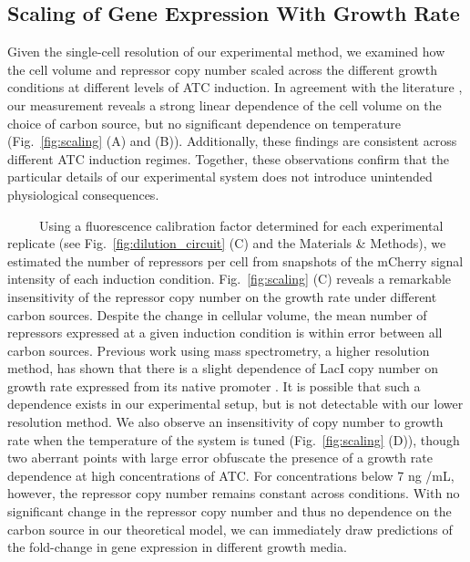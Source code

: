 \documentclass[12pt]{caltech_thesis}
\begin{document}
\hypertarget{scaling-of-gene-expression-with-growth-rate}{%
\subsection{Scaling of Gene Expression With Growth
Rate}\label{scaling-of-gene-expression-with-growth-rate}}

Given the single-cell resolution of our experimental method, we examined
how the cell volume and repressor copy number scaled across the
different growth conditions at different levels of ATC induction. In
agreement with the literature
\autocite{schaechter1958,jun2018,shehata1975}, our measurement reveals a
strong linear dependence of the cell volume on the choice of carbon
source, but no significant dependence on temperature
(Fig.~\ref{fig:scaling} (A) and (B)). Additionally, these findings are
consistent across different ATC induction regimes. Together, these
observations confirm that the particular details of our experimental
system does not introduce unintended physiological consequences.

~~~~~Using a fluorescence calibration factor determined for each
experimental replicate (see Fig.~\ref{fig:dilution_circuit} (C) and the
Materials \& Methods), we estimated the number of repressors per cell
from snapshots of the mCherry signal intensity of each induction
condition. Fig.~\ref{fig:scaling} (C) reveals a remarkable insensitivity
of the repressor copy number on the growth rate under different carbon
sources. Despite the change in cellular volume, the mean number of
repressors expressed at a given induction condition is within error
between all carbon sources. Previous work using mass spectrometry, a
higher resolution method, has shown that there is a slight dependence of
LacI copy number on growth rate expressed from its native promoter
\autocite{schmidt2016}. It is possible that such a dependence exists in
our experimental setup, but is not detectable with our lower resolution
method. We also observe an insensitivity of copy number to growth rate
when the temperature of the system is tuned (Fig.~\ref{fig:scaling}
(D)), though two aberrant points with large error obfuscate the presence
of a growth rate dependence at high concentrations of ATC. For
concentrations below 7 ng /mL, however, the repressor copy number
remains constant across conditions. With no significant change in the
repressor copy number and thus no dependence on the carbon source in our
theoretical model, we can immediately draw predictions of the
fold-change in gene expression in different growth media.
\end{document}
